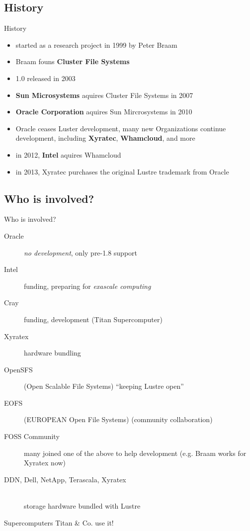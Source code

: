 \subsection{History}
\begin{frame}{History}
    \begin{itemize}
        \item started as a research project in 1999 by Peter Braam
        \item Braam founs \textbf{Cluster File Systems}
        \item 1.0 released in 2003
        \item \textbf{Sun Microsystems} aquires Cluster File Systems in 2007
        \item \textbf{Oracle Corporation} aquires Sun Mircrosystems in 2010
        \item Oracle ceases Luster development, many new Organizations continue
            development, including \textbf{Xyratec},  \textbf{Whamcloud}, and
            more
        \item in 2012, \textbf{Intel} aquires Whamcloud
        \item in 2013, Xyratec purchases the original Lustre trademark from Oracle
    \end{itemize}
\end{frame}

\subsection{Who is involved?}
\begin{frame}{Who is involved?}
    \begin{description}
        \item[Oracle] \emph{no development}, only pre-1.8 support
        \item[Intel] funding, preparing for \emph{exascale computing}
        \item[Cray] funding, development (Titan Supercomputer)
        \item[Xyratex] hardware bundling
        \item[OpenSFS] (Open Scalable File Systems) ``keeping Lustre open''
        \item[EOFS] (EUROPEAN Open File Systems) (community collaboration)
        \item[FOSS Community] many joined one of the above to help development
            (e.g. Braam works for Xyratex now)
        \item[DDN, Dell, NetApp, Terascala, Xyratex]\hfill \\
            storage hardware bundled with Lustre
    \end{description}
\end{frame}

\begin{frame}{Supercomputers}
    Titan \& Co. use it!
\end{frame}
